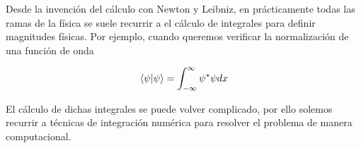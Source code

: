 \noindent Desde la invención del cálculo con Newton y Leibniz, en prácticamente todas las ramas de la física se suele recurrir a el cálculo de integrales para definir magnitudes físicas. Por ejemplo, cuando queremos verificar la normalización de una función de onda

\begin{equation*}
  \braket{\psi | \psi} = \displaystyle\int_{-\infty}^{\infty} \psi^{*} \psi dx
\end{equation*}

El cálculo de dichas integrales se puede volver complicado, por ello solemos recurrir a técnicas de integración numérica para resolver el problema de manera computacional.